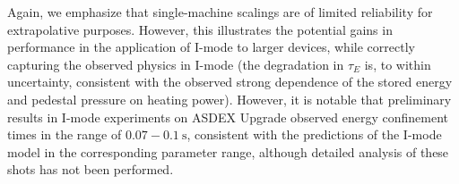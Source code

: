 Again, we emphasize that single-machine scalings are of limited reliability for extrapolative purposes.  However, this illustrates the potential gains in performance in the application of I-mode to larger devices, while correctly capturing the observed physics in I-mode (\eg the degradation in $\tau_E$ is, to within uncertainty, consistent with the observed strong dependence of the stored energy and pedestal pressure on heating power).  However, it is notable that preliminary results in I-mode experiments on ASDEX Upgrade observed energy confinement times in the range of $0.07-\SI{0.1}{\second}$, consistent with the predictions of the I-mode model in the corresponding parameter range, although detailed analysis of these shots has not been performed.\nicesectionending



